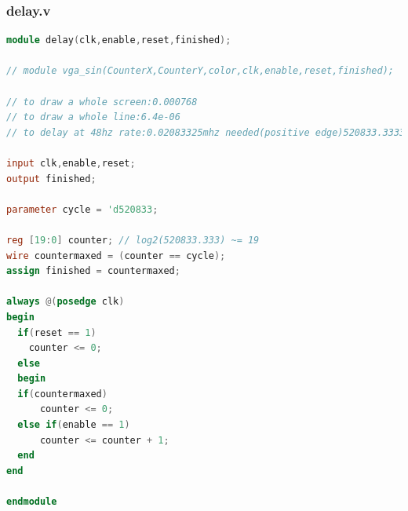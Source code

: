 \documentclass[11pt]{scrartcl}
\begin{document}
\subsubsection{delay.v}
\label{sec:delayv}
\begin{lstlisting}[language=Verilog]
module delay(clk,enable,reset,finished);

// module vga_sin(CounterX,CounterY,color,clk,enable,reset,finished);

// to draw a whole screen:0.000768
// to draw a whole line:6.4e-06
// to delay at 48hz rate:0.02083325mhz needed(positive edge)520833.3333

input clk,enable,reset;
output finished;

parameter cycle = 'd520833;

reg [19:0] counter; // log2(520833.333) ~= 19
wire countermaxed = (counter == cycle);
assign finished = countermaxed;

always @(posedge clk)
begin
  if(reset == 1)
    counter <= 0;
  else
  begin
  if(countermaxed)
      counter <= 0;
  else if(enable == 1)
      counter <= counter + 1;
  end
end

endmodule
\end{lstlisting}
\end{document}
